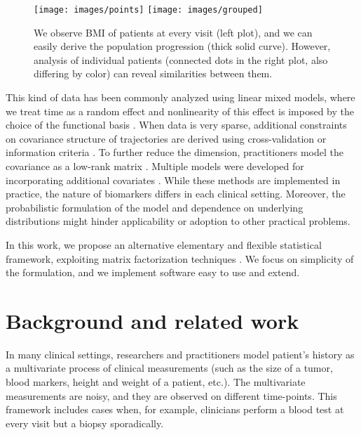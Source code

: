 \documentclass[preprint]{imsart}
\numberwithin{equation}{section}
\theoremstyle{plain}
\begin{document}
\begin{figure}[h]
  \texttt{[image: images/points]}
  \texttt{[image: images/grouped]}
  \caption{We observe BMI of patients at every visit (left plot), and we can easily derive the population progression (thick solid curve). However, analysis of individual patients (connected dots in the right plot, also differing by color) can reveal similarities between them.}
  \label{fig:motivation}
\end{figure}

This kind of data has been commonly analyzed using linear mixed models, where we treat time as a random effect and nonlinearity of this effect is imposed by the choice of the functional basis \citep{zeger1988models, verbeke1997linear, mcculloch2001generalized}. When data is very sparse, additional constraints on covariance structure of trajectories are derived using cross-validation or information criteria \citep{rice2001nonparametric,bigelow2009bayesian}. To further reduce the dimension, practitioners model the covariance as a low-rank matrix \citep{james2000principal,berkey1983longitudinal, yan2017dynamic, hall2006properties, besse1986principal, yao2006penalized, greven2011longitudinal}. Multiple models were developed for incorporating additional covariates \citep{song2002semiparametric, liu2009joint, rizopoulos2014combining}. While these methods are implemented in practice, the nature of biomarkers differs in each clinical setting. Moreover, the probabilistic formulation of the model and dependence on underlying distributions might hinder applicability or adoption to other practical problems.

In this work, we propose an alternative elementary and flexible statistical framework, exploiting matrix factorization techniques \citep{mazumder2010spectral, hastie2015matrix, fazel2002matrix, cai2010singular}. We focus on simplicity of the formulation, and we implement software easy to use and extend. 

\section{Background and related work}\label{s:background}

In many clinical settings, researchers and practitioners model patient's history as a multivariate process of clinical measurements (such as the size of a tumor, blood markers, height and weight of a patient, etc.). The multivariate measurements are noisy, and they are observed on different time-points. This framework includes cases when, for example, clinicians perform a blood test at every visit but a biopsy sporadically. 
\end{document}
